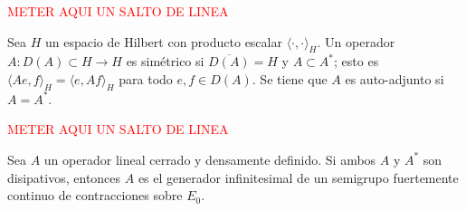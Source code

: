 \textcolor{red}{METER AQUI UN SALTO DE LINEA}\\

\begin{Definicion}
    \label{ch:semigrupos:def:OpAutoAdj}
    Sea $H$ un espacio de Hilbert con producto escalar $\langle \cdot, \cdot \rangle_H$. Un operador $A : D(A) \subset H \rightarrow H$ es simétrico si $\overline{D(A)} = H$ y $A \subset A^*$; esto es $\langle Ae, f \rangle_H = \langle e, Af \rangle_H$ para todo $e,f \in D(A)$. Se tiene que $A$ es auto-adjunto si $A = A^*$.
\end{Definicion}

\textcolor{red}{METER AQUI UN SALTO DE LINEA}\\

\begin{Corolario}
    \label{ch:semigrupos:cor:CorolarioLumerPhillips}
    Sea $A$ un operador lineal cerrado y densamente definido. Si ambos $A$ y $A^*$ son disipativos, entonces $A$ es el generador infinitesimal de un semigrupo fuertemente continuo de contracciones sobre $E_0$.
\end{Corolario}

